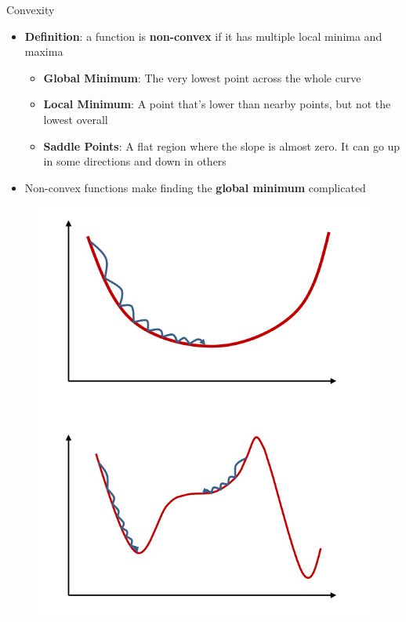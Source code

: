 \documentclass[serif, aspectratio=169]{beamer}
\begin{document}
\begin{frame}{Convexity}
    \begin{minipage}{0.5\linewidth}
    \begin{itemize}
        \item \textbf{Definition}: a function is \textbf{non-convex} if it has multiple local minima and maxima
        \begin{itemize}
            \item \textbf{Global Minimum}: The very lowest point across the whole curve
            \item \textbf{Local Minimum}:  A point that's lower than nearby points, but not the lowest overall
            \item \textbf{Saddle Points}: A flat region where the slope is almost zero. It can go up in some directions and down in others
        \end{itemize}
        \item Non-convex functions make finding the \textbf{global minimum} complicated
    \end{itemize}
    \end{minipage}%
    \begin{minipage}{0.5\linewidth}
        \begin{figure}[h]
            \centering
            \includegraphics[height=.70\textheight]{pic/convex_nonconvex.png}

\end{figure}
\end{minipage}
\end{frame}
\end{document}
